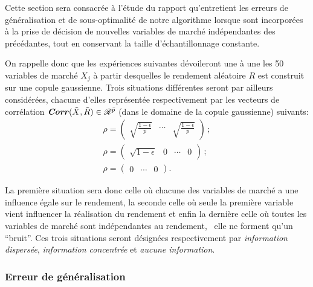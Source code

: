 Cette section sera consacrée à l'étude du rapport qu'entretient les erreurs de
généralisation et de sous-optimalité de notre algorithme lorsque sont incorporées à la
prise de décision de nouvelles variables de marché indépendantes des précédantes, tout en
conservant la taille d'échantillonnage constante.

On rappelle donc que les expériences suivantes dévoileront une à une les 50 variables de
marché $X_j$ à partir desquelles le rendement aléatoire $R$ est construit sur une copule
gaussienne. Trois situations différentes seront par ailleurs considérées, chacune d'elles
représentée respectivement par les vecteurs de corrélation
$\operatorname{\mbox{\textbf{\textit{Corr}}}}(\tilde X,\tilde R) \in \mathscr{R}^{\bar p}$ (dans le domaine de la copule gaussienne)
suivants:
\begin{gather}
  \rho = \left(\begin{matrix}\sqrt{\frac{1-\epsilon}{\bar p}} & \cdots & \sqrt{\frac{1-\epsilon}{\bar
          p}}\end{matrix}\right)\,;\\
  \rho = \left(\begin{matrix}\sqrt{1-\epsilon} & 0 & \cdots & 0\end{matrix}\right)\,;\\
  \rho = \left(\begin{matrix}0 & \cdots & 0\end{matrix}\right).
\end{gather}

La première situation sera donc celle où chacune des variables de marché a une influence
égale sur le rendement, la seconde celle où seule la première variable vient influencer la
réalisation du rendement et enfin la dernière celle où toutes les variables de marché sont
indépendantes au rendement, \ie\ elle ne forment qu'un ``bruit''. Ces trois situations
seront désignées respectivement par \textit{information dispersée}, \textit{information
  concentrée} et \textit{aucune information}.


\subsubsection{Erreur de généralisation}


